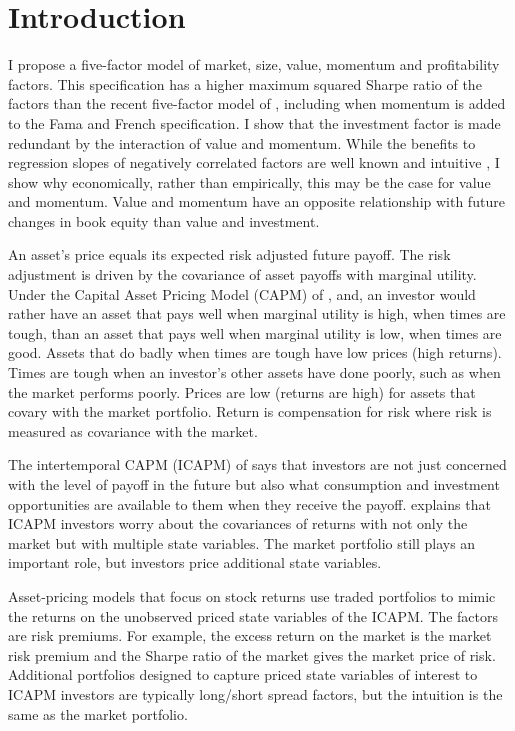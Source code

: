 
\section{Introduction}

I propose a five-factor model of market, size, value, momentum and profitability factors.
This specification has a higher maximum squared Sharpe ratio of the factors than the
recent five-factor model of \textcite{fama2015five}, including when momentum is added to
the Fama and French specification. I show that the investment factor is made redundant by
the interaction of value and momentum. While the benefits to regression slopes of
negatively correlated factors are well known and intuitive
\parencite{asness1997interaction, fama2015incremental}, I show why economically, rather
than empirically, this may be the case for value and momentum. Value and momentum have an
opposite relationship with future changes in book equity than value and investment.

An asset’s price equals its expected risk adjusted future payoff. The risk adjustment is
driven by the covariance of asset payoffs with marginal utility. Under the Capital Asset
Pricing Model (CAPM) of \textcite{sharpe1964capital}, \textcite{lintner1965valuation}
and\textcite{black1972capital}, an investor would rather have an asset that pays well when
marginal utility is high, when times are tough, than an asset that pays well when marginal
utility is low, when times are good. Assets that do badly when times are tough have low
prices (high returns). Times are tough when an investor’s other assets have done poorly,
such as when the market performs poorly. Prices are low (returns are high) for assets that
covary with the market portfolio. Return is compensation for risk where risk is measured
as covariance with the market.

The intertemporal CAPM (ICAPM) of \textcite{merton1973intertemporal} says that investors are
not just concerned with the level of payoff in the future but also what consumption and
investment opportunities are available to them when they receive the payoff.
\textcite{fama1996multifactor} explains that ICAPM investors worry about the covariances
of returns with not only the market but with multiple state variables. The market
portfolio still plays an important role, but investors price additional state variables.

Asset-pricing models that focus on stock returns use traded portfolios to mimic the
returns on the unobserved priced state variables of the ICAPM. The factors are risk
premiums. For example, the excess return on the market is the market risk premium and the
Sharpe ratio of the market gives the market price of risk. Additional portfolios designed
to capture priced state variables of interest to ICAPM investors are typically long/short
spread factors, but the intuition is the same as the market portfolio.

